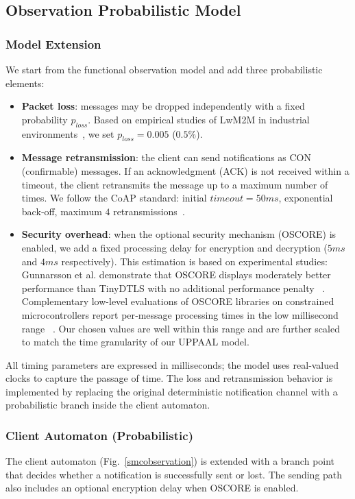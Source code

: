 \documentclass[a4paper,fleqn]{cas-sc}
\begin{document}
\subsection{Observation Probabilistic Model}
\subsubsection{Model Extension}
We start from the functional observation model and add three probabilistic elements:
\begin{itemize}
    \item \textbf{Packet loss}: messages may be dropped independently with a fixed probability $p_{loss}$. Based on empirical studies of LwM2M in industrial environments~\cite{ge2019design}, we set $p_{loss} = 0.005$ ($0.5\%$).
    \item \textbf{Message retransmission}: the client can send notifications as CON (confirmable) messages. If an acknowledgment (ACK) is not received within a timeout, the client retransmits the message up to a maximum number of times. We follow the CoAP standard: initial $timeout = 50 ms$, exponential back‑off, maximum $4$ retransmissions~\cite{shelby2014rfc}.
    \item \textbf{Security overhead}: when the optional security mechanism (OSCORE) is enabled, we add a fixed processing delay for encryption and decryption ($5 ms$ and $4 ms$ respectively).
    This estimation is based on experimental studies: Gunnarsson et al. demonstrate that OSCORE displays moderately better performance than TinyDTLS with no additional performance penalty ~\cite{gunnarsson2021evaluating}. Complementary low-level evaluations of OSCORE libraries on constrained microcontrollers report per‑message processing times in the low millisecond range ~\cite{gundougan2020iot}. Our chosen values are well within this range and are further scaled to match the time granularity of our UPPAAL model.
\end{itemize}

All timing parameters are expressed in milliseconds; the model uses real‑valued clocks to capture the passage of time. The loss and retransmission behavior is implemented by replacing the original deterministic notification channel with a probabilistic branch inside the client automaton.

\subsubsection{Client Automaton (Probabilistic)}
The client automaton (Fig.~\ref{smcobservation}) is extended with a branch point that decides whether a notification is successfully sent or lost. The sending path also includes an optional encryption delay when OSCORE is enabled.
\end{document}
